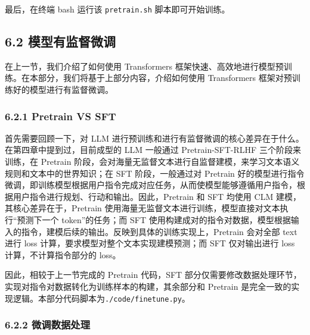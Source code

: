\documentclass[12pt,a4paper]{book}
\begin{document}
\begin{Shaded}
\begin{Highlighting}[]
    \FunctionTok{:} \FunctionTok{,}
    \FunctionTok{:} \FunctionTok{,}
    \FunctionTok{:} \FunctionTok{,}
    \FunctionTok{:} \FunctionTok{,}
    \FunctionTok{:} \FunctionTok{,}
    \FunctionTok{:} 
\FunctionTok{\}}
\end{Highlighting}
\end{Shaded}

最后，在终端 bash 运行该 \texttt{pretrain.sh} 脚本即可开始训练。

\subsection{6.2
模型有监督微调}\label{ux6a21ux578bux6709ux76d1ux7763ux5faeux8c03}

在上一节，我们介绍了如何使用 Transformers
框架快速、高效地进行模型预训练。在本部分，我们将基于上部分内容，介绍如何使用
Transformers 框架对预训练好的模型进行有监督微调。

\subsubsection{6.2.1 Pretrain VS SFT}\label{pretrain-vs-sft}

首先需要回顾一下，对 LLM
进行预训练和进行有监督微调的核心差异在于什么。在第四章中提到过，目前成型的
LLM 一般通过 Pretrain-SFT-RLHF 三个阶段来训练，在 Pretrain
阶段，会对海量无监督文本进行自监督建模，来学习文本语义规则和文本中的世界知识；在
SFT 阶段，一般通过对 Pretrain
好的模型进行指令微调，即训练模型根据用户指令完成对应任务，从而使模型能够遵循用户指令，根据用户指令进行规划、行动和输出。因此，Pretrain
和 SFT 均使用 CLM 建模，其核心差异在于，Pretrain
使用海量无监督文本进行训练，模型直接对文本执行``预测下一个
token''的任务；而 SFT
使用构建成对的指令对数据，模型根据输入的指令，建模后续的输出。反映到具体的训练实现上，Pretrain
会对全部 text 进行 loss 计算，要求模型对整个文本实现建模预测；而 SFT
仅对输出进行 loss 计算，不计算指令部分的 loss。

因此，相较于上一节完成的 Pretrain 代码，SFT
部分仅需要修改数据处理环节，实现对指令对数据转化为训练样本的构建，其余部分和
Pretrain
是完全一致的实现逻辑。本部分代码脚本为\texttt{./code/finetune.py}。

\subsubsection{6.2.2
微调数据处理}\label{ux5faeux8c03ux6570ux636eux5904ux7406}
\end{document}
